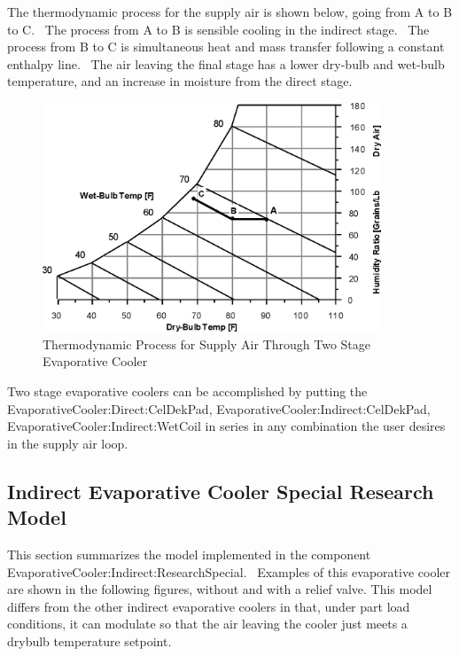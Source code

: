 The thermodynamic process for the supply air is shown below, going from A to B to C.~ The process from A to B is sensible cooling in the indirect stage.~ The process from B to C is simultaneous heat and mass transfer following a constant enthalpy line.~ The air leaving the final stage has a lower dry-bulb and wet-bulb temperature, and an increase in moisture from the direct stage.

\begin{figure}[hbtp] %
\centering
\includegraphics[width=0.9\textwidth, height=0.9\textheight, keepaspectratio=true]{media/image4807.png}
\caption{Thermodynamic Process for Supply Air Through Two Stage Evaporative Cooler \protect \label{fig:thermodynamic-process-for-supply-air-through}}
\end{figure}

Two stage evaporative coolers can be accomplished by putting the EvaporativeCooler:Direct:CelDekPad, EvaporativeCooler:Indirect:CelDekPad, EvaporativeCooler:Indirect:WetCoil in series in any combination the user desires in the supply air loop.

\subsection{Indirect Evaporative Cooler Special Research Model}\label{indirect-evaporative-cooler-special-research-model}

This section summarizes the model implemented in the component EvaporativeCooler:Indirect:ResearchSpecial.~ Examples of this evaporative cooler are shown in the following figures, without and with a relief valve. This model differs from the other indirect evaporative coolers in that, under part load conditions, it can modulate so that the air leaving the cooler just meets a drybulb temperature setpoint.

